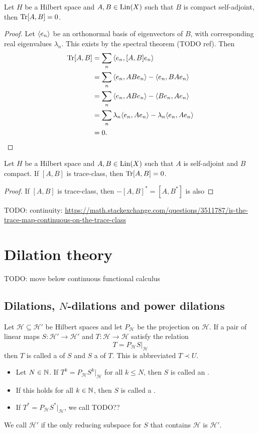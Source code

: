 \begin{proposition} \label{traceCommutatorCompactSA}
Let $H$ be a Hilbert space and $A,B\in\operatorname{Lin}(X)$ such that $B$ is compact self-adjoint, then $\operatorname{Tr}[A,B] = 0$.
\end{proposition}
\begin{proof}
Let $\left\langle e_n \right\rangle$ be an orthonormal basis of eigenvectors of $B$, with corresponding real eigenvalues $\lambda_n$. This exists by the spectral theorem (TODO ref). Then
\begin{align*}
\Tr[A,B] &= \sum_n\inner{e_n, [A,B]e_n} \\
&= \sum_n\inner{e_n, ABe_n} - \inner{e_n, BAe_n} \\
&= \sum_n\inner{e_n, ABe_n} - \inner{Be_n, Ae_n} \\
&= \sum_n\lambda_n\inner{e_n, Ae_n} - \lambda_n\inner{e_n, Ae_n} \\
&= 0.
\end{align*}
\end{proof}
\begin{corollary}
Let $H$ be a Hilbert space and $A,B\in\operatorname{Lin}(X)$ such that $A$ is self-adjoint and $B$ compact. If $[A,B]$ is trace-class, then $\operatorname{Tr}[A,B] = 0$.
\end{corollary}
\begin{proof}
If $[A,B]$ is trace-class, then $-[A,B]^* = [A,B^*]$ is also 
\end{proof}

TODO: continuity: \url{https://math.stackexchange.com/questions/3511787/is-the-trace-map-continuous-on-the-trace-class}

\section{Dilation theory}
TODO: move below continuous functional calculus
\subsection{Dilations, $N$-dilations and power dilations}
\begin{definition}
Let $\mathcal{H} \subseteq \mathcal{H}'$ be Hilbert spaces and let $P_\mathcal{H}$ be the projection on $\mathcal{H}$. If a pair of linear maps $S: \mathcal{H}'\to\mathcal{H}'$ and $T: \mathcal{H}\to \mathcal{H}$ satisfy the relation
\[ T = P_\mathcal{H} S |_\mathcal{H} \]
then $T$ is called a  of $S$ and $S$ a  of $T$. This is abbreviated $T\prec U$.

\begin{itemize}
\item Let $N\in\mathbb{N}$. If $T^k = P_\mathcal{H} S^k |_\mathcal{H}$ for all $k\leq N$, then $S$ is called an .
\item If this holds for all $k\in\mathbb{N}$, then $S$ is called a .
\item If $T^* = P_\mathcal{H} S^* |_\mathcal{H}$, we call TODO??
\end{itemize}
We call $\mathcal{H}'$  if the only reducing subspace for $S$ that contains $\mathcal{H}$ is $\mathcal{H}'$.
\end{definition}

